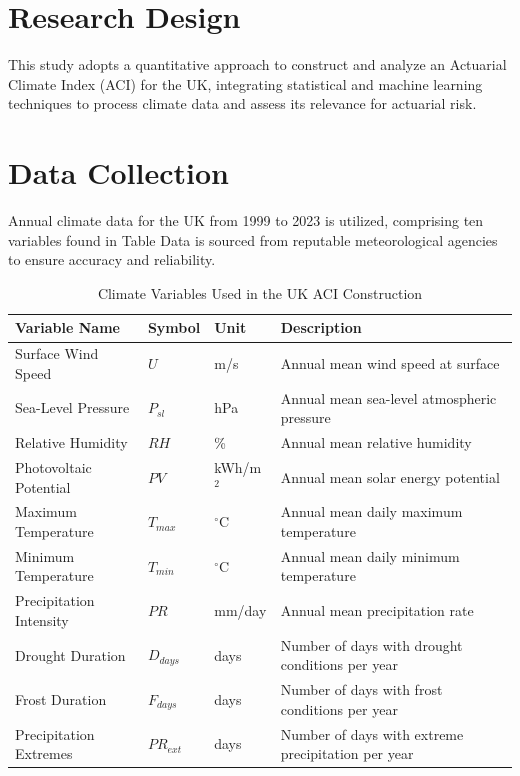 \documentclass[12pt,a4paper]{report}
\begin{document}
\section{Research Design}
This study adopts a quantitative approach to construct and analyze an Actuarial Climate Index (ACI) for the UK, integrating statistical and machine learning techniques to process climate data and assess its relevance for actuarial risk.

\section{Data Collection}
Annual climate data for the UK from 1999 to 2023 is utilized, comprising ten variables found in Table  Data is sourced from reputable meteorological agencies to ensure accuracy and reliability.

\begin{table}[H]
\centering
\renewcommand{\arraystretch}{1}
\setlength{\tabcolsep}{15pt}

\begin{tabular}{lll>{\raggedright\arraybackslash}p{5cm}}
\hline
\textbf{Variable Name} & \textbf{Symbol} & \textbf{Unit} & \textbf{Description} \\
\hline
Surface Wind Speed & $U$ & m/s & Annual mean wind speed at surface \\
Sea-Level Pressure & $P_{sl}$ & hPa & Annual mean sea-level atmospheric pressure \\
Relative Humidity & $RH$ & \% & Annual mean relative humidity \\
Photovoltaic Potential & $PV$ & kWh/m$^2$ & Annual mean solar energy potential \\
Maximum Temperature & $T_{max}$ & $^\circ$C & Annual mean daily maximum temperature \\
Minimum Temperature & $T_{min}$ & $^\circ$C & Annual mean daily minimum temperature \\
Precipitation Intensity & $PR$ & mm/day & Annual mean precipitation rate \\
Drought Duration & $D_{days}$ & days & Number of days with drought conditions per year \\
Frost Duration & $F_{days}$ & days & Number of days with frost conditions per year \\
Precipitation Extremes & $PR_{ext}$ & days & Number of days with extreme precipitation per year \\
\hline
\end{tabular}
\caption{Climate Variables Used in the UK ACI Construction}
\label{tab:climate_factors}
\end{table}
\end{document}
